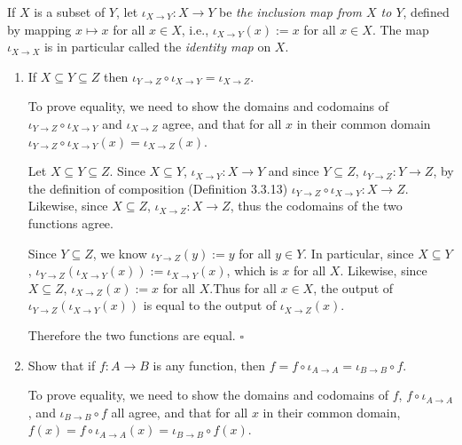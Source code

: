 \documentclass[../../main.tex]{subfiles}
\begin{document}
\begin{q}
    If $X$ is a subset of $Y$, let $\iota_{X\to Y} : X \to Y$ be \emph{the inclusion map from $X$ to $Y$}, defined by mapping $x \mapsto x$ for all $x \in X$, i.e., $\iota_{X\to Y}(x) := x$ for all $x \in X$.
    The map $\iota_{X\to X}$ is in particular called the \emph{identity map} on $X$.
\end{q}
\begin{enumerate}
    \item
    \begin{q}
        If $X \subseteq Y \subseteq Z$ then $\iota_{Y\to Z} \circ \iota_{X\to Y} = \iota_{X\to Z}$.
    \end{q}

    \begin{prf}
        To prove equality, we need to show the domains and codomains of $\iota_{Y\to Z} \circ \iota_{X\to Y}$ and $\iota_{X\to Z}$ agree, and that for all $x$ in their common domain $\iota_{Y\to Z} \circ \iota_{X\to Y}(x) = \iota_{X\to Z}(x)$.

        Let $X \subseteq Y \subseteq Z$. Since $X \subseteq Y$, $\iota_{X\to Y}: X \to Y$ and since $Y \subseteq Z$, $\iota_{Y\to Z}: Y \to Z$, by the definition of composition (Definition 3.3.13) $\iota_{Y\to Z} \circ \iota_{X\to Y}: X \to Z$. Likewise, since $X \subseteq Z$, $\iota_{X\to Z}: X \to Z$, thus the codomains of the two functions agree.

        Since $Y \subseteq Z$, we know $\iota_{Y\to Z}(y) := y$ for all $y \in Y$.
        In particular, since $X \subseteq Y$, $\iota_{Y\to Z}(\iota_{X\to Y}(x)) := \iota_{X\to Y}(x)$, which is $x$ for all $X$.
        Likewise, since $X \subseteq Z$, $\iota_{X\to Z}(x) := x$ for all $X$.Thus for all $x \in X$, the output of $\iota_{Y\to Z}(\iota_{X\to Y}(x))$ is equal to the output of $\iota_{X\to Z}(x)$.

        Therefore the two functions are equal.
        $\square$
    \end{prf}

    \item 
    \begin{q}
        Show that if $f: A \to B$ is any function, then $f = f \circ \iota_{A \to A} = \iota_{B \to B} \circ f$.
    \end{q}

    \begin{prf}
        To prove equality, we need to show the domains and codomains of $f$, $f \circ \iota_{A \to A}$, and $\iota_{B \to B} \circ f$ all agree, and that for all $x$ in their common domain, $f(x) = f \circ \iota_{A \to A}(x) = \iota_{B \to B} \circ f(x)$.


\end{prf}
\end{enumerate}
\end{document}
